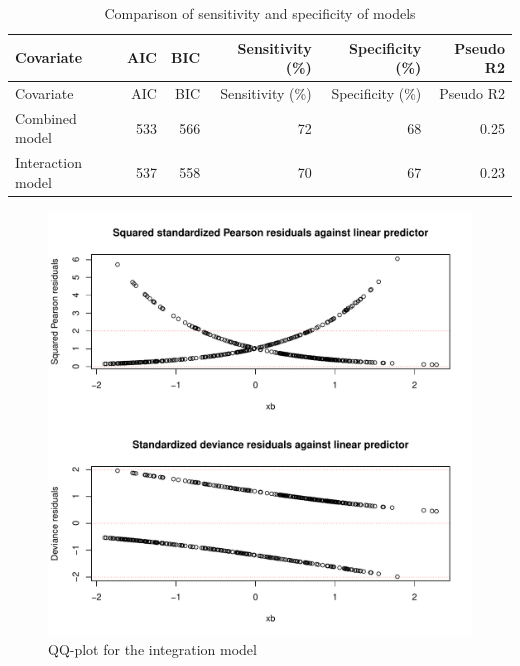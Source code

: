 \documentclass[a4paper]{article}
\begin{document}
\begin{longtable}[]{@{}lrrrrr@{}}
\caption{\label{tab:compare_sense_spec_interaction}Comparison of
sensitivity and specificity of models}\tabularnewline
\toprule
Covariate & AIC & BIC & Sensitivity (\%) & Specificity (\%) & Pseudo
R2\tabularnewline
\midrule
\endfirsthead
\toprule
Covariate & AIC & BIC & Sensitivity (\%) & Specificity (\%) & Pseudo
R2\tabularnewline
\midrule
\endhead
Combined model & 533 & 566 & 72 & 68 & 0.25\tabularnewline
Interaction model & 537 & 558 & 70 & 67 & 0.23\tabularnewline
\bottomrule
\end{longtable}

\newpage

\begin{figure}[h]
\includegraphics{Project_2_files/figure-latex/unnamed-chunk-16-1} \caption{\label{fig:qq-plot_interaction}QQ-plot for the integration model}\label{fig:unnamed-chunk-16}
\end{figure}
\end{document}
